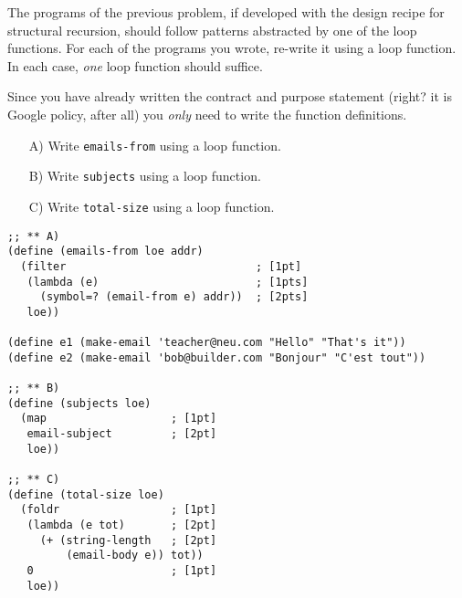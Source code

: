 \documentclass[12pt]{article}                   %
\def\pts#1{\marginpar{\footnotesize \raggedright  \fbox{#1 {\sc Points}}}}
\newenvironment{solution}{}{}
\begin{document}
\begin{problem}\pts{13}
 
  The programs of the previous problem, if developed with the design
  recipe for structural recursion, should follow patterns abstracted
  by one of the loop functions.
  For each of the programs you wrote, re-write it using a loop function.
  In each case, \emph{one} loop function should suffice.

Since you have already written the contract and purpose statement
(right? it is Google policy, after all) you \textit{only} need to
write the function definitions.

\begin{itemize}
\item[A)\;] Write \texttt{emails-from} using a loop function.

\item[B)\;] Write \texttt{subjects} using a loop function.

\item[C)\;] Write \texttt{total-size} using a loop function.
\end{itemize}

\ifrubric\else
{}
\newpage
\fi

\begin{solution}
\begin{verbatim}
;; ** A)
(define (emails-from loe addr)
  (filter                             ; [1pt]
   (lambda (e)                        ; [1pts]
     (symbol=? (email-from e) addr))  ; [2pts]
   loe))

(define e1 (make-email 'teacher@neu.com "Hello" "That's it"))
(define e2 (make-email 'bob@builder.com "Bonjour" "C'est tout"))

;; ** B)
(define (subjects loe)
  (map                   ; [1pt]
   email-subject         ; [2pt]
   loe))

;; ** C)
(define (total-size loe)
  (foldr                 ; [1pt]
   (lambda (e tot)       ; [2pt]
     (+ (string-length   ; [2pt]
         (email-body e)) tot))
   0                     ; [1pt]
   loe))
\end{verbatim}
\end{solution}
\end{problem}
\end{document}
